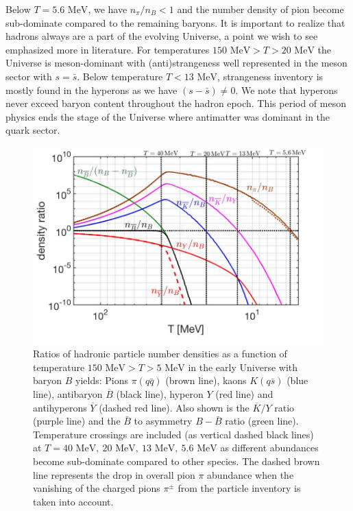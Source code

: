 \documentclass[universe,article,submit,moreauthors,pdftex,a4paper]{Definitions/mdpi}
\newcommand{\MeV}{\text{ MeV}}
\begin{document}
Below $T=5.6\MeV$, we have $n_\pi/n_B<1$ and the number density of pion become sub-dominate compared to the remaining baryons. It is important to realize that hadrons always are a part of the evolving Universe, a point we wish to see emphasized more in literature. For temperatures $150\MeV>T>20\MeV$ the Universe is meson-dominant with (anti)strangeness well represented in the meson sector with $s=\bar s$. Below temperature $T<13\MeV$, strangeness inventory is mostly found in the hyperons as we have $(s -\bar s)\ne 0$. We note that hyperons never exceed baryon content throughout the hadron epoch. This period of meson physics ends the stage of the Universe where antimatter was dominant in the quark sector.

\begin{figure}[bt]
\centering
\includegraphics[width=\textwidth]{./plots/Meson_Baryon_density_ratio_CTYang.jpg}
\caption{Ratios of hadronic particle number densities as a function of temperature $150\MeV>T>5\MeV$ in the early Universe with baryon $B$ yields: Pions $\pi(q\bar q)$ (brown line), kaons $K( q\bar s)$ (blue line), antibaryon $\overline B$ (black line), hyperon $Y$ (red line) and antihyperons $\overline Y$ (dashed red line). Also shown is the $\overline K/Y$ ratio (purple line) and the $\bar B$ to asymmetry $B-\bar B$ ratio (green line). Temperature crossings are included (as vertical dashed black lines) at $T=40\MeV,\ 20\MeV,\ 13\MeV,\ 5.6\MeV$ as different abundances become sub-dominate compared to other species. The dashed brown line represents the drop in overall pion $\pi$ abundance when the vanishing of the charged pions $\pi^{\pm}$ from the particle inventory is taken into account.}
\label{EquilibPartRatiosFig}
\end{figure}
\end{document}

